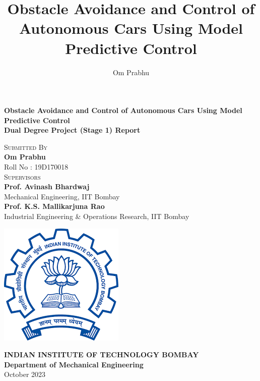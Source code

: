 \documentclass[11pt,a4paper]{report}
\begin{document}
\title{Obstacle Avoidance and Control of Autonomous Cars Using Model Predictive Control}
\author{Om Prabhu}

\begin{titlepage}
\begin{center}
        \vspace*{1in}
        {\Large \textbf{Obstacle Avoidance and Control of Autonomous Cars Using \newline Model Predictive Control\\
        }}
        \vspace*{0.4in}
        {\large \textbf{Dual Degree Project (Stage 1) Report}\\}
        \vspace*{0.4in}     
        
        \textsc{Submitted By}\\
        \vspace{.2cm}
        {\large \textbf{Om Prabhu}} \\
        {Roll No : 19D170018} \\
        \vspace*{.4in}
        \textsc{Supervisors} \\
        \vspace{.2cm}
        {\large \textbf{Prof. Avinash Bhardwaj}} \\
        {Mechanical Engineering, IIT Bombay} \\ 
        \vspace*{.2cm}
        {\large \textbf{Prof. K.S. Mallikarjuna Rao}} \\ 
        {Industrial Engineering \& Operations Research, IIT Bombay} \\
        \vspace*{0.5in}

        \begin{center}
        \includegraphics[scale = 0.5]{iitb_logo.png}
        \end{center}
        \vspace*{0.2in}
       
        \Large{ \textbf{ INDIAN INSTITUTE OF TECHNOLOGY BOMBAY}}\\
        \vspace{.3cm}
        \large {{\textbf{Department of Mechanical Engineering}}}\\
        \vspace{.3cm}
        { October 2023 }
        \vfill
    \end{center}
\end{titlepage}
    
\end{document}
